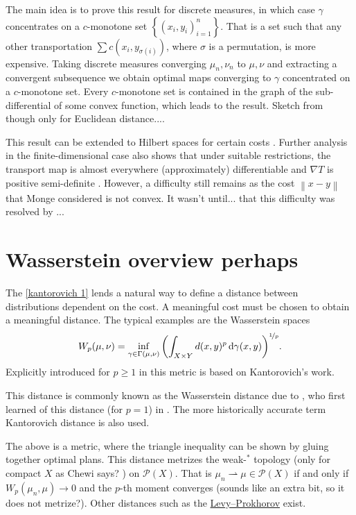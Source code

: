 \documentclass[
    a4paper,
    DIV=14,
    abstract=true,
    numbers=noenddot
]
{scrartcl}
\theoremstyle{definition}
\newcommand{\set}[1]{\left\{#1\right\}}
\renewcommand{\norm}[1]{\left\lVert #1 \right\rVert}\renewcommand{\abs}[1]{\left| #1 \right|}
\renewcommand{\d}{\,\mathrm{d}}\newcommand{\dx}{\,\mathrm{d}x}
\newcommand{\Pp}{\mathcal{P}}
\begin{document}
The main idea is to prove this result for discrete measures, in which case $\gamma $ concentrates on a $c$-monotone set $\set{(x_i,y_i)_{i=1}^n}$. That is a set such that any other transportation $\sum c(x_i, y_{\sigma(i)}) $, where $\sigma $ is a permutation,  is more expensive. Taking discrete measures converging $\mu_n, \nu _n$  to $\mu , \nu $ and extracting a convergent subsequence we obtain optimal maps converging to $\gamma $ concentrated on a $c$-monotone set.  Every $c$-monotone set is contained in the graph of the sub-differential of some convex function, which leads to the result. Sketch from \cite[Corollary 2.15]{bogachev2012monge} though only for Euclidean distance....

This result can be extended to Hilbert spaces for certain costs \cite[Theorem 6.2.10]{ambrosio2005gradient}. Further analysis in the finite-dimensional case also shows that under suitable restrictions, the transport map is almost everywhere (approximately) differentiable and $\nabla T$ is positive semi-definite \cite[Theorem 6.2.7]{ambrosio2005gradient}.
However, a difficulty still remains as the cost $\norm{x-y}$  that Monge considered is not convex. It wasn't until... that this difficulty was resolved by ... 


\section{Wasserstein overview perhaps}
The \eqref{kantorovich 1} lends a natural way to define a distance between distributions dependent on the cost. A meaningful cost must be chosen to obtain a meaningful distance. The typical examples are the Wasserstein spaces
\begin{align*}
    W_p (\mu , \nu )=   \inf_{\gamma \in \Gamma (\mu ,\nu )}\qty(\int_{X\times Y} d(x,y)^p \d \gamma (x,y))^{\nicefrac{1}{p}}.
\end{align*}
Explicitly introduced for $p \geq 1$ in  \cite[Lemma 3]{zolotarev1976continuity} this metric is based on Kantorovich's work. 

This distance is commonly known as the Wasserstein distance due to \cite{dobrushin1970prescribing}, who first learned of this distance (for $p=1$) in \cite{vaserstein1969markov}. The more historically accurate term Kantorovich distance is also used.

The above is a metric, where the triangle inequality can be shown by gluing together optimal plans. This distance metrizes the weak-$^*$ topology (only for compact $X$ as Chewi says? ) on $\Pp (X)$. That is $\mu _n \rightharpoonup \mu \in \Pp (X)$ if and only if $W_p(\mu _n,\mu ) \to 0$ and the $p$-th moment converges (sounds like an extra bit, so it does not metrize?). Other distances such as the \href{https://en.wikipedia.org/wiki/L%C3%A9vy%E2%80%93Prokhorov_metric}{Levy--Prokhorov}  exist.    
\end{document}

